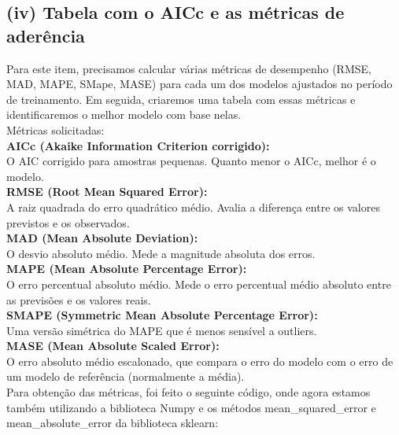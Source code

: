 \documentclass[a4paper, 12pt]{article}
\begin{document}
\subsection{(iv) Tabela com o AICc e as métricas de aderência}

Para este item, precisamos calcular várias métricas de desempenho (RMSE, MAD, 
MAPE, SMape, MASE) para cada um dos modelos ajustados no período de treinamento. Em seguida, criaremos uma tabela com essas métricas e identificaremos o melhor modelo com base nelas.\\

Métricas solicitadas:\\

\textbf{AICc (Akaike Information Criterion corrigido):}\\
O AIC corrigido para amostras pequenas. Quanto menor o AICc, melhor é o modelo.\\


\textbf{RMSE (Root Mean Squared Error):}\\
A raiz quadrada do erro quadrático médio. Avalia a diferença entre os valores previstos e os observados.\\

\textbf{MAD (Mean Absolute Deviation):}\\
O desvio absoluto médio. Mede a magnitude absoluta dos erros.\\


\textbf{MAPE (Mean Absolute Percentage Error):}\\
O erro percentual absoluto médio. Mede o erro percentual médio absoluto entre as previsões e os valores reais.\\

\textbf{SMAPE (Symmetric Mean Absolute Percentage Error):}\\
Uma versão simétrica do MAPE que é menos sensível a outliers.\\

\textbf{MASE (Mean Absolute Scaled Error):}\\
O erro absoluto médio escalonado, que compara o erro do modelo com o erro de um modelo de referência (normalmente a média).\\


Para obtenção das métricas, foi feito o seguinte código, onde agora estamos também utilizando a biblioteca Numpy e os métodos mean\_squared\_error e mean\_absolute\_error da biblioteca sklearn:
\end{document}
